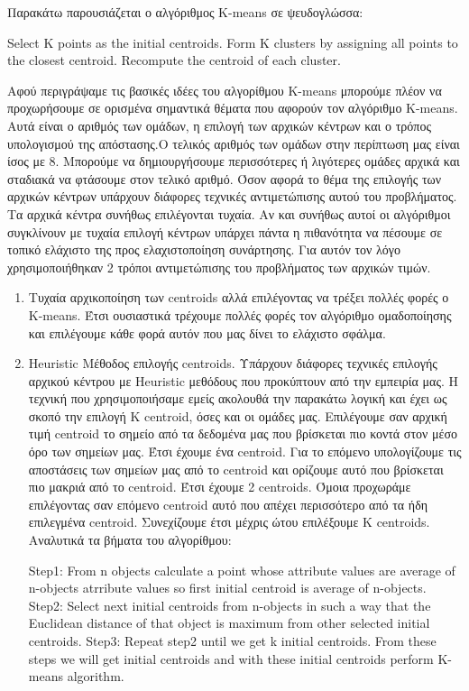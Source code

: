 Παρακάτω παρουσιάζεται ο αλγόριθμος K-means σε ψευδογλώσσα:

\begin{algorithmic}[H]
	\State Select K points as the initial centroids.
	\Do
	\State Form K clusters by assigning all points to the closest centroid.
	\State Recompute the centroid of each cluster.
\end{algorithmic}

Αφού περιγράψαμε τις βασικές ιδέες του αλγορίθμου K-means μπορούμε πλέον να προχωρήσουμε σε ορισμένα σημαντικά θέματα που αφορούν τον αλγόριθμο K-means. Αυτά είναι ο αριθμός των ομάδων, η επιλογή των αρχικών κέντρων και ο τρόπος υπολογισμού της απόστασης.Ο τελικός αριθμός των ομάδων στην περίπτωση μας είναι ίσος με 8. Μπορούμε να δημιουργήσουμε περισσότερες ή λιγότερες ομάδες αρχικά και σταδιακά να φτάσουμε στον τελικό αριθμό. Όσον αφορά το θέμα της επιλογής των αρχικών κέντρων υπάρχουν διάφορες τεχνικές αντιμετώπισης αυτού του προβλήματος. Τα αρχικά κέντρα συνήθως επιλέγονται τυχαία. Αν και συνήθως αυτοί οι αλγόριθμοι συγκλίνουν με τυχαία επιλογή κέντρων υπάρχει πάντα η πιθανότητα να πέσουμε σε τοπικό ελάχιστο της προς ελαχιστοποίηση συνάρτησης. Για αυτόν τον λόγο χρησιμοποιήθηκαν 2 τρόποι αντιμετώπισης του προβλήματος των αρχικών τιμών. 
\begin{enumerate}
	\item Τυχαία αρχικοποίηση των centroids αλλά επιλέγοντας να τρέξει πολλές φορές ο K-means. Έτσι ουσιαστικά τρέχουμε πολλές φορές τον αλγόριθμο ομαδοποίησης και επιλέγουμε κάθε φορά αυτόν που μας δίνει το ελάχιστο σφάλμα.
	\item Heuristic Μέθοδος επιλογής centroids. Υπάρχουν διάφορες τεχνικές επιλογής αρχικού κέντρου με Heuristic μεθόδους που προκύπτουν από την εμπειρία μας. Η τεχνική που χρησιμοποιήσαμε εμείς ακολουθά την παρακάτω λογική και έχει ως σκοπό την επιλογή Κ centroid, όσες και οι ομάδες μας. Επιλέγουμε σαν αρχική τιμή centroid το σημείο από τα δεδομένα μας που βρίσκεται πιο κοντά στον μέσο όρο των σημείων μας. Έτσι έχουμε ένα centroid. Για το επόμενο υπολογίζουμε τις αποστάσεις των σημείων μας από το centroid και ορίζουμε αυτό που βρίσκεται πιο μακριά από το centroid. Έτσι έχουμε 2 centroids. Όμοια προχωράμε επιλέγοντας σαν επόμενο centroid αυτό που απέχει περισσότερο από τα ήδη επιλεγμένα centroid. Συνεχίζουμε έτσι μέχρις ώτου επιλέξουμε K centroids. Αναλυτικά τα βήματα του αλγορίθμου:
	
	\begin{algorithmic}[H]
		\State Step1: From n objects calculate a point whose attribute values are average of n-objects atrribute values so first initial centroid is average of n-objects.
		\State
	    \State Step2: Select next initial centroids from n-objects in such a way that the Euclidean distance of that object is maximum from other selected initial centroids.
	    \State
	    \State Step3: Repeat step2 until we get k initial centroids.
	    \State
	    \State From these steps we will get initial centroids and with these initial centroids perform K-means algorithm.
	\end{algorithmic}
\end{enumerate}

